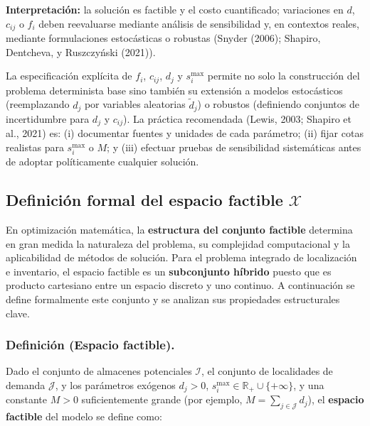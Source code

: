 \documentclass[
  spanish,
  us-letterpaper,
  DIV=11,
  numbers=noendperiod]{scrreprt}
\numberwithin{equation}{section}
\begin{document}
\textbf{Interpretación:} la solución es factible y el costo
cuantificado; variaciones en \(d\), \(c_{ij}\) o \(f_i\) deben
reevaluarse mediante análisis de sensibilidad y, en contextos reales,
mediante formulaciones estocásticas o robustas (Snyder (2006); Shapiro,
Dentcheva, y Ruszczyński (2021)).

La especificación explícita de \(f_i\), \(c_{ij}\), \(d_j\) y
\(s_i^{\max}\) permite no solo la construcción del problema determinista
base sino también su extensión a modelos estocásticos (reemplazando
\(d_j\) por variables aleatorias \(\tilde d_j\)) o robustos (definiendo
conjuntos de incertidumbre para \(d_j\) y \(c_{ij}\)). La práctica
recomendada (Lewis, 2003; Shapiro et al., 2021) es: (i) documentar
fuentes y unidades de cada parámetro; (ii) fijar cotas realistas para
\(s_i^{\max}\) o \(M\); y (iii) efectuar pruebas de sensibilidad
sistemáticas antes de adoptar políticamente cualquier solución.

\subsection{\texorpdfstring{\textbf{Definición formal del espacio
factible
\(\mathcal{X}\)}}{Definición formal del espacio factible \textbackslash mathcal\{X\}}}\label{definiciuxf3n-formal-del-espacio-factible-mathcalx}

En optimización matemática, la \textbf{estructura del conjunto factible}
determina en gran medida la naturaleza del problema, su complejidad
computacional y la aplicabilidad de métodos de solución. Para el
problema integrado de localización e inventario, el espacio factible es
un \textbf{subconjunto híbrido} puesto que es producto cartesiano entre
un espacio discreto y uno continuo. A continuación se define formalmente
este conjunto y se analizan sus propiedades estructurales clave.

\subsubsection{\texorpdfstring{\textbf{Definición (Espacio
factible).}}{Definición (Espacio factible).}}\label{definiciuxf3n-espacio-factible.}

Dado el conjunto de almacenes potenciales \(\mathcal{I}\), el conjunto
de localidades de demanda \(\mathcal{J}\), y los parámetros exógenos
\(d_j > 0\), \(s_i^{\max} \in \mathbb{R}_+ \cup \{+\infty\}\), y una
constante \(M > 0\) suficientemente grande (por ejemplo,
\(M = \sum_{j \in \mathcal{J}} d_j\)), el \textbf{espacio factible} del
modelo se define como:
\end{document}
